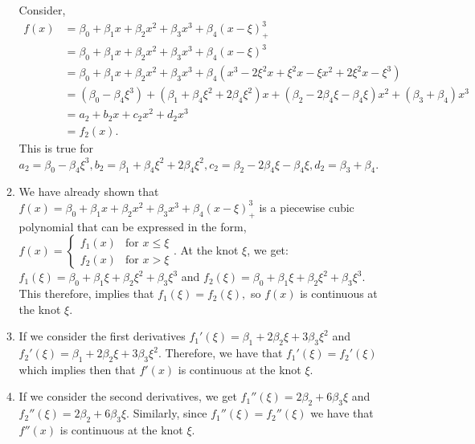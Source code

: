\documentclass{article}
\begin{document}
\begin{enumerate}
\begin{enumerate}
        Consider, 
        \begin{align*}
            f(x) &= \beta_0 + \beta_1x + \beta_2x^2 + \beta_3x^3 + \beta_4(x-\xi)^3_+\\
            &= \beta_0 + \beta_1x + \beta_2x^2 + \beta_3x^3 + \beta_4(x-\xi)^3\\
            &= \beta_0 + \beta_1x + \beta_2x^2 + \beta_3x^3 + \beta_4(x^3 - 2\xi^2x + \xi^2x - \xi x^2 + 2\xi^2x - \xi^3)\\
            &= (\beta_0 -\beta_4\xi^3) + (\beta_1 + \beta_4\xi^2 + 2\beta_4\xi^2)x + (\beta_2-2\beta_4\xi-\beta_4\xi) x^2 + (\beta_3 + \beta_4)x^3\\
            &= a_2 + b_2x + c_2x^2 + d_2x^3\\
            &= f_2(x).
        \end{align*} This is true for $a_2 = \beta_0 -\beta_4\xi^3, b_2 = \beta_1 + \beta_4\xi^2 + 2\beta_4\xi^2, c_2 = \beta_2-2\beta_4\xi-\beta_4\xi, d_2 = \beta_3 + \beta_4.$
        
        \item 
        
        We have already shown that $f(x) = \beta_0 + \beta_1x + \beta_2x^2 + \beta_3x^3 + \beta_4(x-\xi)^3_+$ is a piecewise cubic polynomial that can be expressed in the form, $f(x) = \begin{cases}
        f_1(x) & \text{for } x \leq \xi\\
        f_2(x) & \text{for } x > \xi
        \end{cases}.$ At the knot $\xi$, we get: $f_1(\xi) = \beta_0 + \beta_1\xi + \beta_2\xi^2 + \beta_3\xi^3$ and $f_2(\xi) = \beta_0 + \beta_1\xi + \beta_2\xi^2 + \beta_3\xi^3$. This therefore, implies that $f_1(\xi) = f_2(\xi),$ so $f(x)$ is continuous at the knot $\xi.$
        
        \item
        
        If we consider the first derivatives $f_1'(\xi) = \beta_1 + 2\beta_2\xi + 3\beta_3\xi^2$ and $f_2'(\xi) = \beta_1 + 2\beta_2\xi + 3\beta_3\xi^2$. Therefore, we have that $f_1'(\xi) = f_2'(\xi)$ which implies then that $f'(x)$ is continuous at the knot $\xi.$
        
        \item
        
        If we consider the second derivatives, we get $f_1''(\xi) = 2\beta_2 + 6\beta_3\xi$ and $f_2''(\xi) = 2\beta_2 + 6\beta_3\xi.$ Similarly, since $f_1''(\xi) = f_2''(\xi)$ we have that $f''(x)$ is continuous at the knot $\xi.$
        

\end{enumerate}
\end{enumerate}
\end{document}
